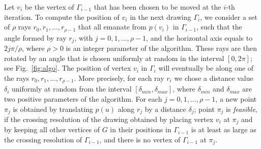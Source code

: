 \documentclass[runningheads]{llncs}
\begin{document}
Let $v_i$ be the vertex of $\Gamma_{i-1}$ that has been chosen to be moved at the $i$-th iteration. 
To compute the position of $v_i$ in the next drawing $\Gamma_i$, we consider a set of $\rho$ rays $r_0,r_1,\ldots,r_{\rho-1}$ that all emanate from $p(v_i)$ in $\Gamma_{i-1}$, such that the angle formed by ray $r_j$, with $j=0,1,\ldots,\rho-1$, and the horizontal axis equals to $2j\pi/\rho$, where $\rho>0$ is an integer parameter of the algorithm. These rays are then rotated by an angle that is chosen uniformly at random in the interval $[0,2\pi]$; see Fig.~\ref{fig:algo}. The position of vertex $v_i$ in $\Gamma_i$ will eventually be along one of the rays $r_0,r_1,\ldots,r_{\rho-1}$. More precisely, for each ray $r_i$ we chose a distance value $\delta_i$ uniformly at random from the interval $[\delta_{min},\delta_{max}]$, where $\delta_{min}$ and $\delta_{max}$ are two positive parameters of the algorithm. For each $j=0,1,\ldots,\rho-1$, a new point $\pi_j$ is obtained by translating $p(u)$ along $r_j$ by a distance $\delta_j$; point $\pi_j$ is \emph{feasible}, if the crossing resolution of the drawing obtained by placing vertex $v_i$ at $\pi_j$ and by keeping all other vertices of $G$ in their positions in $\Gamma_{i-1}$ is at least as large as the crossing resolution of $\Gamma_{i-1}$, and there is no vertex of $\Gamma_{i-1}$ at $\pi_j$. 
\end{document}
